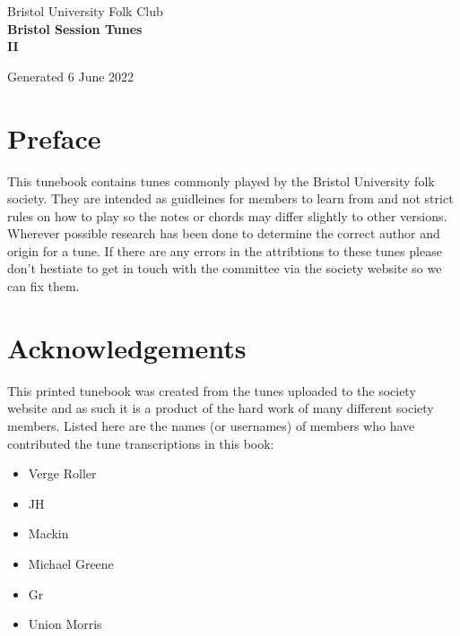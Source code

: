 \documentclass[12pt,a4paper,twoside]{article}
\makeatletter
\newcommand{\thetitle}{Bristol Session Tunes \\ \vspace{0.65cm} II}
\newcommand{\thedate}{6 June 2022}
\renewcommand\tableofcontents{%
    \begin{multicols}{2}[
      \centering
      \section*{\large\contentsname
        \@mkboth{%
           \MakeUppercase\contentsname}{\MakeUppercase\contentsname}}]
    \@starttoc{toc}%
    \end{multicols}
}
\makeatother
\begin{document}
\begin{titlepage}
   \begin{center}
       \large Bristol University Folk Club \\

       \vspace{4cm}
       \textbf{\Huge \thetitle}

       \vspace{0.5cm}
       Generated \thedate

       \vspace{1.5cm}

       \vfill

   \end{center}
\end{titlepage}

\tableofcontents

\section{Preface}

This tunebook contains tunes commonly played by the Bristol University folk society. They are intended as guidleines for members to learn from and not strict rules on how to play so the notes or chords may differ slightly to other versions.
Wherever possible research has been done to determine the correct author and origin for a tune. If there are any errors in the attribtions to these tunes please don't hestiate to get in touch with the committee via the society website so we can fix them.

\section{Acknowledgements}

This printed tunebook was created from the tunes uploaded to the society website and as such it is a product of the hard work of many different society members. Listed here are the names (or usernames) of members who have contributed the tune transcriptions in this book:

\begin{multicols}{2}
\begin{itemize}\item Verge Roller
\item JH
\item Mackin
\item Michael Greene
\item Gr
\item Union Morris
\end{itemize}

\end{multicols}
\end{document}
